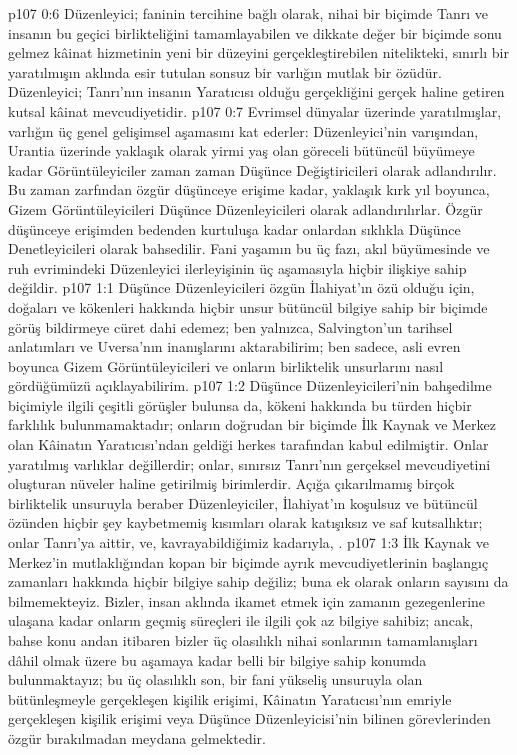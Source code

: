 \vs p107 0:6 Düzenleyici; faninin tercihine bağlı olarak, nihai bir biçimde Tanrı ve insanın bu geçici birlikteliğini tamamlayabilen ve dikkate değer bir biçimde sonu gelmez kâinat hizmetinin yeni bir düzeyini gerçekleştirebilen nitelikteki, sınırlı bir yaratılmışın aklında esir tutulan sonsuz bir varlığın mutlak bir özüdür. Düzenleyici; Tanrı’nın insanın Yaratıcısı olduğu gerçekliğini gerçek haline getiren kutsal kâinat mevcudiyetidir.
\vs p107 0:7 Evrimsel dünyalar üzerinde yaratılmışlar, varlığın üç genel gelişimsel aşamasını kat ederler: Düzenleyici’nin varışından, Urantia üzerinde yaklaşık olarak yirmi yaş olan göreceli bütüncül büyümeye kadar Görüntüleyiciler zaman zaman Düşünce Değiştiricileri olarak adlandırılır. Bu zaman zarfından özgür düşünceye erişime kadar, yaklaşık kırk yıl boyunca, Gizem Görüntüleyicileri Düşünce Düzenleyicileri olarak adlandırılırlar. Özgür düşünceye erişimden bedenden kurtuluşa kadar onlardan sıklıkla Düşünce Denetleyicileri olarak bahsedilir. Fani yaşamın bu üç fazı, akıl büyümesinde ve ruh evrimindeki Düzenleyici ilerleyişinin üç aşamasıyla hiçbir ilişkiye sahip değildir.
\vs p107 1:1 Düşünce Düzenleyicileri özgün İlahiyat’ın özü olduğu için, doğaları ve kökenleri hakkında hiçbir unsur bütüncül bilgiye sahip bir biçimde görüş bildirmeye cüret dahi edemez; ben yalnızca, Salvington’un tarihsel anlatımları ve Uversa’nın inanışlarını aktarabilirim; ben sadece, asli evren boyunca Gizem Görüntüleyicileri ve onların birliktelik unsurlarını nasıl gördüğümüzü açıklayabilirim.
\vs p107 1:2 Düşünce Düzenleyicileri’nin bahşedilme biçimiyle ilgili çeşitli görüşler bulunsa da, kökeni hakkında bu türden hiçbir farklılık bulunmamaktadır; onların doğrudan bir biçimde İlk Kaynak ve Merkez olan Kâinatın Yaratıcısı’ndan geldiği herkes tarafından kabul edilmiştir. Onlar yaratılmış varlıklar değillerdir; onlar, sınırsız Tanrı’nın gerçeksel mevcudiyetini oluşturan nüveler haline getirilmiş birimlerdir. Açığa çıkarılmamış birçok birliktelik unsuruyla beraber Düzenleyiciler, İlahiyat’ın koşulsuz ve bütüncül özünden hiçbir şey kaybetmemiş kısımları olarak katışıksız ve saf kutsallıktır; onlar Tanrı’ya aittir, ve, kavrayabildiğimiz kadarıyla, .
\vs p107 1:3 İlk Kaynak ve Merkez’in mutlaklığından kopan bir biçimde ayrık mevcudiyetlerinin başlangıç zamanları hakkında hiçbir bilgiye sahip değiliz; buna ek olarak onların sayısını da bilmemekteyiz. Bizler, insan aklında ikamet etmek için zamanın gezegenlerine ulaşana kadar onların geçmiş süreçleri ile ilgili çok az bilgiye sahibiz; ancak, bahse konu andan itibaren bizler üç olasılıklı nihai sonlarının tamamlanışları dâhil olmak üzere bu aşamaya kadar belli bir bilgiye sahip konumda bulunmaktayız; bu üç olasılıklı son, bir fani yükseliş unsuruyla olan bütünleşmeyle gerçekleşen kişilik erişimi, Kâinatın Yaratıcısı’nın emriyle gerçekleşen kişilik erişimi veya Düşünce Düzenleyicisi’nin bilinen görevlerinden özgür bırakılmadan meydana gelmektedir.
